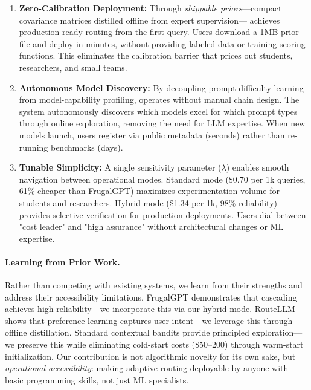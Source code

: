 \begin{enumerate}[leftmargin=*]
    \item \textbf{Zero-Calibration Deployment:} Through \emph{shippable priors}---compact covariance matrices distilled offline from expert supervision---\ours{} achieves production-ready routing from the first query. Users download a 1MB prior file and deploy in minutes, without providing labeled data or training scoring functions. This eliminates the calibration barrier that prices out students, researchers, and small teams.
    
    \item \textbf{Autonomous Model Discovery:} By decoupling prompt-difficulty learning from model-capability profiling, \ours{} operates without manual chain design. The system autonomously discovers which models excel for which prompt types through online exploration, removing the need for LLM expertise. When new models launch, users register via public metadata (seconds) rather than re-running benchmarks (days).
    
    \item \textbf{Tunable Simplicity:} A single sensitivity parameter ($\lambda$) enables smooth navigation between operational modes. Standard mode (\$0.70 per 1k queries, 61\% cheaper than FrugalGPT) maximizes experimentation volume for students and researchers. Hybrid mode (\$1.34 per 1k, 98\% reliability) provides selective verification for production deployments. Users dial between "cost leader" and "high assurance" without architectural changes or ML expertise.
\end{enumerate}

\paragraph{Learning from Prior Work.} Rather than competing with existing systems, we learn from their strengths and address their accessibility limitations. FrugalGPT demonstrates that cascading achieves high reliability---we incorporate this via our hybrid mode. RouteLLM shows that preference learning captures user intent---we leverage this through offline distillation. Standard contextual bandits provide principled exploration---we preserve this while eliminating cold-start costs (\$50--200) through warm-start initialization. Our contribution is not algorithmic novelty for its own sake, but \emph{operational accessibility}: making adaptive routing deployable by anyone with basic programming skills, not just ML specialists.

